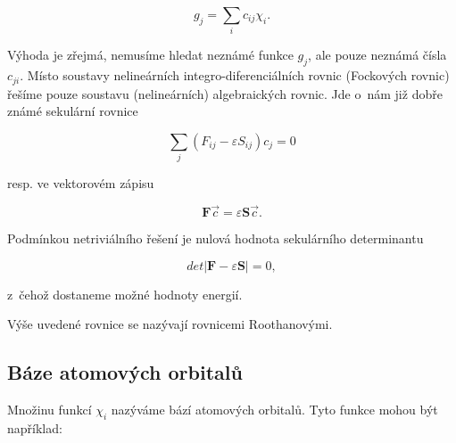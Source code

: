\begin{equation}
g_j = \sum_i c_{ij} \chi_i.
\label{rov:VE-52}
\end{equation}

\noindent Výhoda je zřejmá, nemusíme hledat neznámé funkce $g_j$, ale pouze neznámá čísla $c_{ji}$. Místo soustavy nelineárních integro-diferenciálních rovnic (Fockových rovnic) řešíme pouze soustavu (nelineárních) algebraických rovnic. Jde o~nám již dobře známé sekulární rovnice

\begin{equation}
\sum_j (F_{ij} - \varepsilon S_{ij}) c_j = 0
\label{rov:VE-53}
\end{equation}

\noindent resp. ve vektorovém zápisu

\begin{equation}
\mathbf{F} \vec{c} = \varepsilon \mathbf{S} \vec{c}.
\label{rov:VE-54}
\end{equation}

Podmínkou netriviálního řešení je nulová hodnota sekulárního determinantu

\begin{equation}
det \vert \mathbf{F} - \varepsilon \mathbf{S} \vert = 0,
\label{rov:VE-55}
\end{equation}

z~čehož dostaneme možné hodnoty energií.

Výše uvedené rovnice se nazývají rovnicemi Roothanovými. 


\subsection{Báze atomových orbitalů}

Množinu funkcí $\chi_i$ nazýváme bází atomových orbitalů.  Tyto funkce mohou být například:
 
